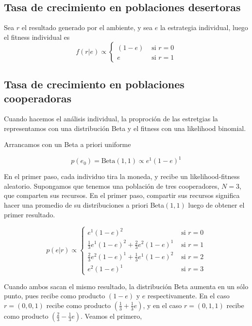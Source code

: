 \documentclass[a4paper,10pt]{article}
\begin{document}
\subsection{Tasa de crecimiento en poblaciones desertoras}

Sea $r$ el resultado generado por el ambiente, y sea $e$ la estrategia individual, luego el fitness individual es
\begin{equation}
f(r|e) \propto 
\begin{cases}
(1-e) & \text{ si } r = 0 \\
e & \text{ si } r = 1
\end{cases}
\end{equation}



\subsection{Tasa de crecimiento en poblaciones cooperadoras}

Cuando hacemos el análisis individual, la proproción de las estretgias la representamos con una distribución Beta y el fitness con una likelihood binomial.

Arrancamos con un Beta a priori uniforme

\begin{equation}
p(e_0) = \text{Beta}(1,1) \propto e^1 (1-e)^1 
\end{equation}

En el primer paso, cada individuo tira la moneda, y recibe un likelihood-fitness aleatorio.
Supongamos que tenemos una población de tres cooperadores, $N=3$, que comparten sus recursos.
En el primer paso, compartir sus recursos significa hacer una promedio de su distribuciones a priori Beta$(1,1)$ luego de obtener el primer resultado.

\begin{equation}
p(e|r) \propto 
\begin{cases}
e^1 (1-e)^2 & \text{ si } r = 0 \\
\frac{1}{3} e^1 (1-e)^2 + \frac{2}{3} e^2 (1-e)^1  & \text{ si } r = 1 \\
\frac{2}{3} e^2 (1-e)^1 + \frac{1}{3} e^1 (1-e)^2    & \text{ si } r = 2 \\
e^2 (1-e)^1 & \text{ si } r = 3
\end{cases}
\end{equation}

Cuando ambos sacan el mismo resultado, la distribución Beta aumenta en un sólo punto, pues recibe como producto $(1-e)$ y $e$ respectivamente.
En el caso $r = (0,0,1)$ recibe como producto $(\frac{1}{3} + \frac{1}{3}e )$, y en el caso $r = (0,1,1)$ recibe como producto $(\frac{2}{3} - \frac{1}{3}e )$.
Veamos el primero,
\end{document}
